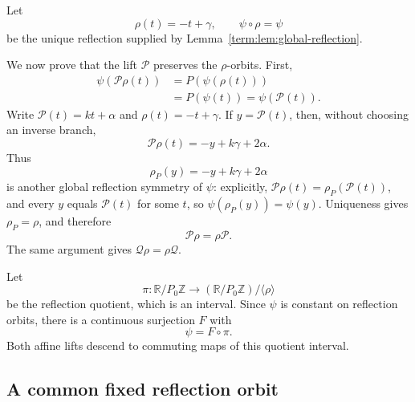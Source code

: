\documentclass[11pt]{article}
\theoremstyle{definition}
\theoremstyle{remark}
\begin{document}
Let
\begin{equation}\label{term:eq:reflection}
 \rho(t)=-t+\gamma,\qquad \psi\circ\rho=\psi
\end{equation}
be the unique reflection supplied by
Lemma~\ref{term:lem:global-reflection}.

We now prove that the lift \(\mathcal P\) preserves the \(\rho\)-orbits.
First,
\[
\begin{split}
 \psi(\mathcal P\rho(t))
 &=P(\psi(\rho(t)))\\
 &=P(\psi(t))
 =\psi(\mathcal P(t)).
\end{split}
\]
Write \(\mathcal P(t)=kt+\alpha\) and
\(\rho(t)=-t+\gamma\).  If \(y=\mathcal P(t)\), then, without choosing an
inverse branch,
\[
 \mathcal P\rho(t)=-y+k\gamma+2\alpha.
\]
Thus
\[
 \rho_P(y)=-y+k\gamma+2\alpha
\]
is another global reflection symmetry of \(\psi\): explicitly,
\(\mathcal P\rho(t)=\rho_P(\mathcal P(t))\), and every \(y\) equals
\(\mathcal P(t)\) for some \(t\), so \(\psi(\rho_P(y))=\psi(y)\).
Uniqueness gives \(\rho_P=\rho\), and therefore
\[
 \mathcal P\rho=\rho\mathcal P.
\]
The same argument gives \(\mathcal Q\rho=\rho\mathcal Q\).

Let
\[
 \pi\colon\mathbb R/P_0\mathbb Z\longrightarrow
 (\mathbb R/P_0\mathbb Z)/\langle\rho\rangle
\]
be the reflection quotient, which is an interval.  Since \(\psi\) is
constant on reflection orbits, there is a continuous surjection \(F\) with
\begin{equation}\label{term:eq:reflection-factor}
 \psi=F\circ\pi.
\end{equation}
Both affine lifts descend to commuting maps of this quotient interval.

\subsection{A common fixed reflection orbit}
\end{document}
